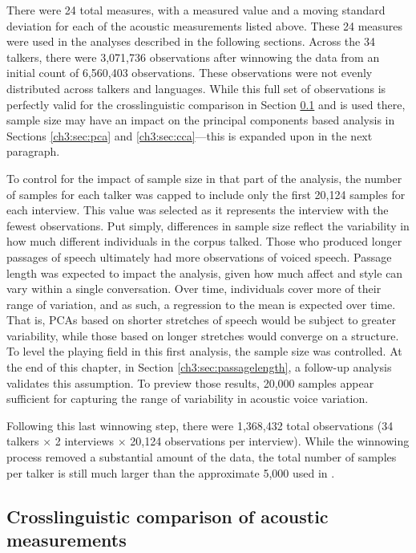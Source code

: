 There were 24 total measures, with a measured value and a moving standard deviation for each of the acoustic measurements listed above. These 24 measures were used in the analyses described in the following sections. Across the 34 talkers, there were 3,071,736 observations after winnowing the data from an initial count of 6,560,403 observations. These observations were not evenly distributed across talkers and languages. While this full set of observations is perfectly valid for the crosslinguistic comparison in Section \ref{ch3:sec:comparison} and is used there, sample size may have an impact on the principal components based analysis in Sections \ref{ch3:sec:pca} and \ref{ch3:sec:cca}---this is expanded upon in the next paragraph.

To control for the impact of sample size in that part of the analysis, the number of samples for each talker was capped to include only the first 20,124 samples for each interview. This value was selected as it represents the interview with the fewest observations. Put simply, differences in sample size reflect the variability in how much different individuals in the corpus talked. Those who produced longer passages of speech ultimately had more observations of voiced speech. Passage length was expected to impact the analysis, given how much affect and style can vary within a single conversation. Over time, individuals cover more of their range of variation, and as such, a regression to the mean is expected over time. That is, PCAs based on shorter stretches of speech would be subject to greater variability, while those based on longer stretches would converge on a structure. To level the playing field in this first analysis, the sample size was controlled. At the end of this chapter, in Section \ref{ch3:sec:passagelength}, a follow-up analysis validates this assumption. To preview those results, 20,000 samples appear sufficient for capturing the range of variability in acoustic voice variation.

Following this last winnowing step, there were 1,368,432 total observations (34 talkers $\times$ 2 interviews $\times$ 20,124 observations per interview). While the winnowing process removed a substantial amount of the data, the total number of samples per talker is still much larger than the approximate 5,000 used in \citet{lee_2019_acoustic}. 

\subsection{Crosslinguistic comparison of acoustic measurements}\label{ch3:sec:comparison}

